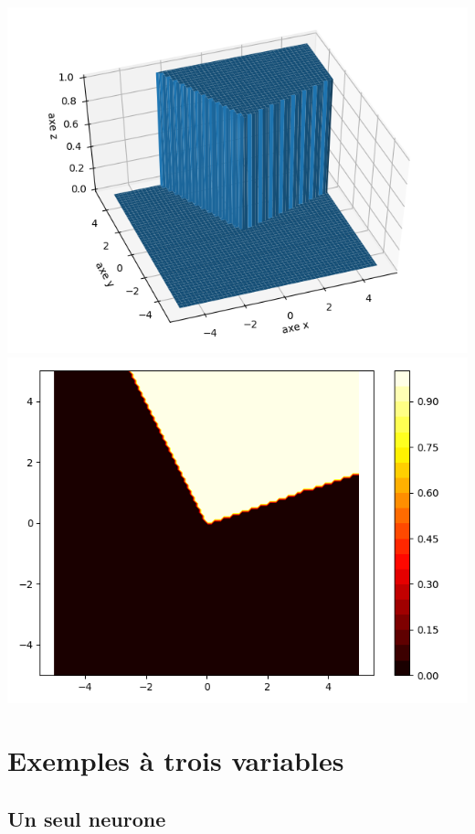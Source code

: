 \documentclass[11pt,class=report,crop=false]{standalone}
\begin{document}
\begin{center}
\includegraphics[scale=\myscale,scale=0.5]{figures/pythontf-2var-3d-02}
\includegraphics[scale=\myscale,scale=0.4]{figures/pythontf-2var-2d-02}
\end{center}

\section{Exemples à trois variables}

\subsection{Un seul neurone}
\end{document}
